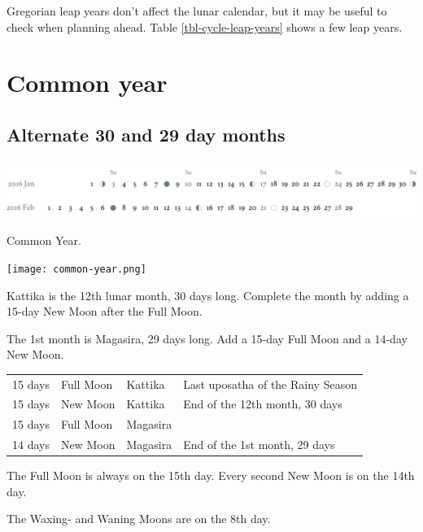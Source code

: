 \documentclass[11pt,oneside]{memoir-article}
\begin{document}
Gregorian leap years don't affect the lunar calendar, but it may be useful to
check when planning ahead. Table \ref{tbl-cycle-leap-years} shows a few leap
years.

\clearpage

\section{Common year}
\label{sec-2-2}
\label{common-year}
\subsection{Alternate 30 and 29 day months}
\label{sec-2-2-1}

\begin{fullwidth}
\includegraphics[width=\linewidth]{two-months.pdf}
\end{fullwidth}

\begin{marginfigure}[20mm]
\caption{\label{fig-common-year} Common Year.}
\texttt{[image: common-year.png]}
\end{marginfigure}

Kattika is the 12th lunar month, 30 days long. Complete the month by adding a
15-day New Moon after the Full Moon.

The 1st month is Magasira, 29 days long. Add a 15-day Full Moon and a 14-day New
Moon.

\begin{center}
\begin{tabular}{llll}
15 days & \mF{} Full Moon & Kattika & Last uposatha of the Rainy Season\\
15 days & \mN{} New Moon & Kattika & End of the 12th month, 30 days\\
15 days & \mF{} Full Moon & Magasira & \\
14 days & \mN{} New Moon & Magasira & End of the 1st month, 29 days\\
\end{tabular}
\end{center}

The Full Moon is always on the 15th day. Every second New Moon is on the 14th day.

The \GaWaxingmoon{} Waxing- and \GaWaningmoon{} Waning Moons are on the 8th day.
\end{document}
